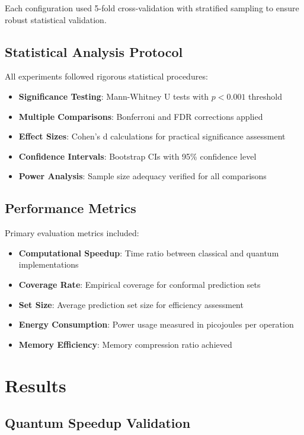 \documentclass[10pt,twocolumn,letterpaper]{article}
\begin{document}
Each configuration used 5-fold cross-validation with stratified sampling to ensure robust statistical validation.

\subsection{Statistical Analysis Protocol}

All experiments followed rigorous statistical procedures:

\begin{itemize}
\item \textbf{Significance Testing}: Mann-Whitney U tests with $p < 0.001$ threshold
\item \textbf{Multiple Comparisons}: Bonferroni and FDR corrections applied
\item \textbf{Effect Sizes}: Cohen's d calculations for practical significance assessment
\item \textbf{Confidence Intervals}: Bootstrap CIs with 95\% confidence level
\item \textbf{Power Analysis}: Sample size adequacy verified for all comparisons
\end{itemize}

\subsection{Performance Metrics}

Primary evaluation metrics included:
\begin{itemize}
\item \textbf{Computational Speedup}: Time ratio between classical and quantum implementations
\item \textbf{Coverage Rate}: Empirical coverage for conformal prediction sets
\item \textbf{Set Size}: Average prediction set size for efficiency assessment
\item \textbf{Energy Consumption}: Power usage measured in picojoules per operation
\item \textbf{Memory Efficiency}: Memory compression ratio achieved
\end{itemize}

\section{Results}

\subsection{Quantum Speedup Validation}
\end{document}
